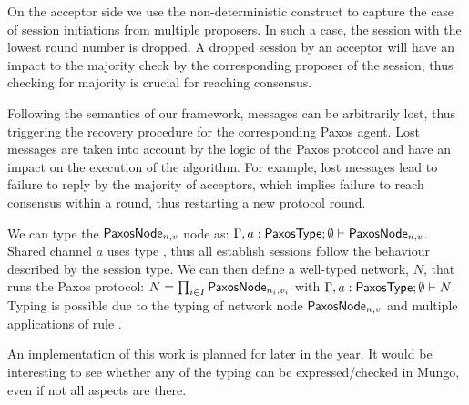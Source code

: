 On the acceptor side we use the non-deterministic construct to
capture the case of session initiations from multiple proposers.
In such a case, the session with the lowest round number is
dropped. A dropped session by an acceptor will have an impact to
the majority check by the corresponding proposer
of the session, thus checking for majority is crucial for reaching
consensus.

Following the semantics of our framework, messages can be arbitrarily
lost, thus triggering the recovery procedure for the corresponding
Paxos agent. Lost messages are taken into account by the logic of the
Paxos protocol and have an impact on the execution of the algorithm.
%
For example, lost messages lead to failure to reply by the majority of
acceptors, which implies failure to reach consensus within a round,
thus restarting a new protocol round.
%

We can type the $\mathsf{PaxosNode}_{n, v}$ node as:
$\Gamma, a: \mathsf{PaxosType}; \emptyset \mathrel{\vdash} \mathsf{PaxosNode}_{n, v}$.
%
Shared channel $a$ uses type \PaxosType, thus all establish sessions
follow the behaviour described by the \PaxosType session type.
%
We can then define a well-typed network, $N$, that runs the
Paxos protocol:
$
	N = \prod_{i \in I} \mathsf{PaxosNode}_{n_i, v_i}
$
with $\Gamma, a: \mathsf{PaxosType}; \emptyset \mathrel{\vdash} N$. Typing is possible
due to the typing of network node $\mathsf{PaxosNode}_{n, v}$ and multiple
applications of rule \TPar.


An implementation of this work is planned for later in the year. It would be interesting to see whether any of the typing can be expressed/checked in Mungo, even if not all aspects are there.
